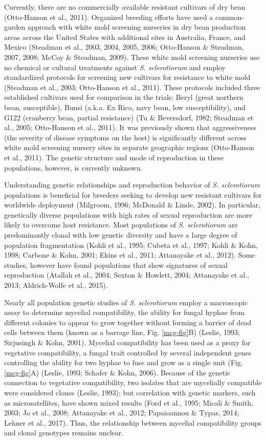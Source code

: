 \documentclass[fleqn,10pt,lineno]{wlpeerj} %
\theoremstyle{definition}
\theoremstyle{definition}
\theoremstyle{definition}
\theoremstyle{remark}
\begin{document}
Currently, there are no commercially available resistant cultivars of
dry bean (Otto-Hanson et al., 2011). Organized breeding efforts have
used a common-garden approach with white mold screening nurseries in dry
bean production areas across the United States with additional sites in
Australia, France, and Mexico (Steadman et al., 2003, 2004, 2005, 2006;
Otto-Hanson \& Steadman, 2007, 2008; McCoy \& Steadman, 2009). These
white mold screening nurseries use no chemical or cultural treatments
against \emph{S. sclerotiorum} and employ standardized protocols for
screening new cultivars for resistance to white mold (Steadman et al.,
2003; Otto-Hanson et al., 2011). These protocols included three
established cultivars used for comparison in the trials: Beryl (great
northern bean, susceptible), Bunsi (a.k.a. Ex Rico, navy bean, low
susceptibility), and G122 (cranberry bean, partial resistance) (Tu \&
Beversdorf, 1982; Steadman et al., 2005; Otto-Hanson et al., 2011). It
was previously shown that aggressiveness (the severity of disease
symptoms on the host) is significantly different across white mold
screening nursery sites in separate geographic regions (Otto-Hanson et
al., 2011). The genetic structure and mode of reproduction in these
populations, however, is currently unknown.

Understanding genetic relationships and reproduction behavior of
\emph{S. sclerotiorum} populations is beneficial for breeders seeking to
develop new resistant cultivars for worldwide deployment (Milgroom,
1996; McDonald \& Linde, 2002). In particular, genetically diverse
populations with high rates of sexual reproduction are more likely to
overcome host resistance. Most populations of \emph{S. sclerotiorum} are
predominantly clonal with low genetic diversity and have a large degree
of population fragmentation (Kohli et al., 1995; Cubeta et al., 1997;
Kohli \& Kohn, 1998; Carbone \& Kohn, 2001; Ekins et al., 2011;
Attanayake et al., 2012). Some studies, however have found populations
that show signatures of sexual reproduction (Atallah et al., 2004;
Sexton \& Howlett, 2004; Attanayake et al., 2013; Aldrich-Wolfe et al.,
2015).

Nearly all population genetic studies of \emph{S. sclerotiorum} employ a
macroscopic assay to determine mycelial compatibility, the ability for
fungal hyphae from different colonies to appear to grow together without
forming a barrier of dead cells between them (known as a barrage line,
Fig. \ref{mcg-fig}B) (Leslie, 1993; Sirjusingh \& Kohn, 2001). Mycelial
compatibility has been used as a proxy for vegetative compatibility, a
fungal trait controlled by several independent genes controlling the
ability for two hyphae to fuse and grow as a single unit (Fig.
\ref{mcg-fig}A) (Leslie, 1993; Schafer \& Kohn, 2006). Because of the
genetic connection to vegetative compatibility, two isolates that are
mycelially compatible were considered clones (Leslie, 1993); but
correlation with genetic markers, such as microsatellites, have shown
mixed results (Ford et al., 1995; Micali \& Smith, 2003; Jo et al.,
2008; Attanayake et al., 2012; Papaioannou \& Typas, 2014; Lehner et
al., 2017). Thus, the relationship between mycelial compatibility groups
and clonal genotypes remains unclear.
\end{document}
